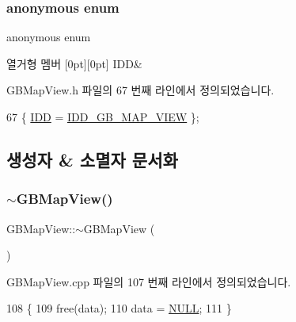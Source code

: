 \subsubsection{\texorpdfstring{anonymous enum}{anonymous enum}}
{\footnotesize\ttfamily anonymous enum}

\begin{DoxyEnumFields}{열거형 멤버}
[0pt][0pt]{}\mbox{\label{class_g_b_map_view_a7888981cacff337e7de3a48be4a69e95a9f52d893a13755f31b76360a8ea894ef}} 
I\+DD&\\
\hline

\end{DoxyEnumFields}


G\+B\+Map\+View.\+h 파일의 67 번째 라인에서 정의되었습니다.


\begin{DoxyCode}
67 \{ \mbox{\hyperlink{class_g_b_map_view_a7888981cacff337e7de3a48be4a69e95a9f52d893a13755f31b76360a8ea894ef}{IDD}} = \mbox{\hyperlink{resource_8h_acc59e963ff3b17afe0fbb934c043e56a}{IDD\_GB\_MAP\_VIEW}} \};
\end{DoxyCode}


\subsection{생성자 \& 소멸자 문서화}
\mbox{\label{class_g_b_map_view_a40c036e1d605f7046fcda2674feea0e1}} 
\subsubsection{\texorpdfstring{$\sim$\+G\+B\+Map\+View()}{~GBMapView()}}
{\footnotesize\ttfamily G\+B\+Map\+View\+::$\sim$\+G\+B\+Map\+View (\begin{DoxyParamCaption}{ }\end{DoxyParamCaption})}



G\+B\+Map\+View.\+cpp 파일의 107 번째 라인에서 정의되었습니다.


\begin{DoxyCode}
108 \{
109   free(data);
110   data = \mbox{\hyperlink{getopt1_8c_a070d2ce7b6bb7e5c05602aa8c308d0c4}{NULL}};
111 \}
\end{DoxyCode}
\mbox{\label{class_g_b_map_view_ab0e95e7d8dd6638a2451b7faa6937acb}} 
